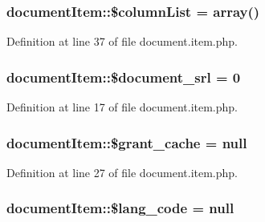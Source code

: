 \hypertarget{classdocumentItem_a244e1382304e15c5ae29e3311ef8e865}{
\subsubsection[{\$column\-List}]{\setlength{\rightskip}{0pt plus 5cm}document\-Item\-::\$column\-List = array()}}\label{classdocumentItem_a244e1382304e15c5ae29e3311ef8e865}


Definition at line 37 of file document.\-item.\-php.

\hypertarget{classdocumentItem_a87159d1cf24944d081646e6fe4f7e0f6}{
\subsubsection[{\$document\-\_\-srl}]{\setlength{\rightskip}{0pt plus 5cm}document\-Item\-::\$document\-\_\-srl = 0}}\label{classdocumentItem_a87159d1cf24944d081646e6fe4f7e0f6}


Definition at line 17 of file document.\-item.\-php.

\hypertarget{classdocumentItem_af1bde72448d1519839d6d07ff873effe}{
\subsubsection[{\$grant\-\_\-cache}]{\setlength{\rightskip}{0pt plus 5cm}document\-Item\-::\$grant\-\_\-cache = null}}\label{classdocumentItem_af1bde72448d1519839d6d07ff873effe}


Definition at line 27 of file document.\-item.\-php.

\hypertarget{classdocumentItem_a5fa7aa5d52f248116250e95126e8ab87}{
\subsubsection[{\$lang\-\_\-code}]{\setlength{\rightskip}{0pt plus 5cm}document\-Item\-::\$lang\-\_\-code = null}}\label{classdocumentItem_a5fa7aa5d52f248116250e95126e8ab87}


